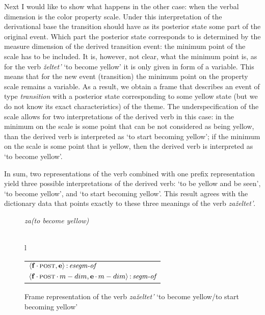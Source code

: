 Next I would like to show what happens in the other case: when the verbal dimension is the color property scale. Under this interpretation of the derivational base the transition should have as its posterior state some part of the original event. Which part the posterior state corresponds to is determined by the measure dimension of the derived transition event: the minimum point of the scale has to be included. It is, however, not clear, what the minimum point is, as for the verb \textit{\v{z}eltet'} `to become yellow' it is only given in form of a variable. This means that for the new event (transition) the minimum point on the property scale remains a variable. As a result, we obtain a frame that describes an event of type \textit{transition} with a posterior state corresponding to some yellow state (but we do not know its exact characteristics) of the theme. The underspecification of the scale allows for two interpretations of the derived verb in this case: in the minimum on the scale is some point that can be not considered as being yellow, than the derived verb is interpreted as `to start becoming yellow'; if the minimum on the scale is some point that is yellow, then the derived verb is interpreted as `to become yellow'.

In sum, two representations of the verb combined with one prefix representation yield three possible interpretations of the derived verb: `to be yellow and be seen', `to become yellow', and `to start becoming yellow'. This result agrees with the dictionary data that points exactly to these three meanings of the verb \textit{za\v{z}eltet'}. 

\begin{figure}
\textit{za(to become yellow)}\\
\\
\begin{tabular}[t]{l}
\end{tabular}
\hfill
\begin{footnotesize}
\begin{tabular}[t]{l}
$\langle{\textbf{\textrm{f}}\,{\cdot}\,\textsc{post},\textbf{\textrm{e}}}\rangle\,{:}\,\textit{esegm-of}$\\[1ex]
$\tuple{\btag{f}\BC\POST\C\MDIM,\btag{e}\BC\MDIM}\D\type{segm-of}$\\
\end{tabular}
\end{footnotesize}
\caption{Frame representation of the verb \textit{za\v{z}eltet'} `to become yellow/to start becoming yellow' \label{frame:zazeltet:yellow}}
\end{figure}


